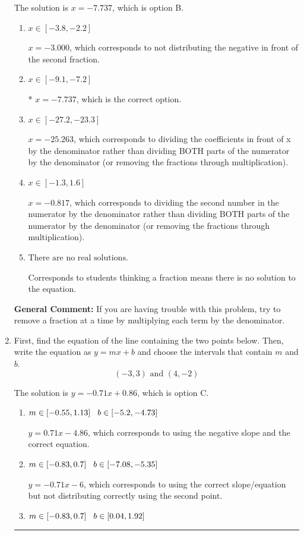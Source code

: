 \documentclass{extbook}[14pt]
\newcommand{\litem}[1]{\item #1

\rule{\textwidth}{0.4pt}}
\begin{document}
\begin{enumerate}
{The solution is \( x = -7.737 \), which is option B.\begin{enumerate}[label=\Alph*.]
\item \( x \in [-3.8, -2.2] \)

 $x = -3.000$, which corresponds to not distributing the negative in front of the second fraction.
\item \( x \in [-9.1, -7.2] \)

* $x = -7.737$, which is the correct option.
\item \( x \in [-27.2, -23.3] \)

 $x = -25.263$, which corresponds to dividing the coefficients in front of x by the denominator rather than dividing BOTH parts of the numerator by the denominator (or removing the fractions through multiplication).
\item \( x \in [-1.3, 1.6] \)

 $x = -0.817$, which corresponds to dividing the second number in the numerator by the denominator rather than dividing BOTH parts of the numerator by the denominator (or removing the fractions through multiplication).
\item \( \text{There are no real solutions.} \)

Corresponds to students thinking a fraction means there is no solution to the equation.
\end{enumerate}

\textbf{General Comment:} If you are having trouble with this problem, try to remove a fraction at a time by multiplying each term by the denominator.
}
\litem{
First, find the equation of the line containing the two points below. Then, write the equation as $ y=mx+b $ and choose the intervals that contain $m$ and $b$.
\[ (-3, 3) \text{ and } (4, -2) \]

The solution is \( y = -0.71x + 0.86 \), which is option C.\begin{enumerate}[label=\Alph*.]
\item \( m \in [-0.55, 1.13] \hspace*{3mm} b \in [-5.2, -4.73] \)

 $y = 0.71x -4.86$, which corresponds to using the negative slope and the correct equation.
\item \( m \in [-0.83, 0.7] \hspace*{3mm} b \in [-7.08, -5.35] \)

 $y = -0.71x -6$, which corresponds to using the correct slope/equation but not distributing correctly using the second point.
\item \( m \in [-0.83, 0.7] \hspace*{3mm} b \in [0.04, 1.92] \)


\end{enumerate}}
\end{enumerate}
\end{document}
